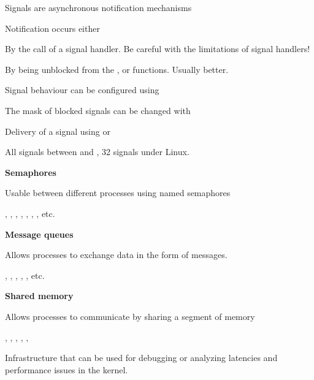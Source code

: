   \startitemize
  \item Signals are asynchronous notification mechanisms
  \item Notification occurs either
    \startitemize
    \item By the call of a signal handler. Be careful with the limitations of signal
      handlers!
    \item By being unblocked from the ,
       or  functions. Usually
      better.
    \stopitemize
  \item Signal behaviour can be configured using 
  \item The mask of blocked signals can be changed with
  \item Delivery of a signal using  or
  \item All signals between  and , 32
    signals under Linux.
  \stopitemize

  \startitemize
  \item {\bf Semaphores}
    \startitemize
    \item Usable between different processes using named semaphores
    \item {}, , ,
      , , ,
      , etc.
    \stopitemize
  \item {\bf Message queues}
    \startitemize
    \item Allows processes to exchange data in the form of messages.
    \item {}, , ,
      , , etc.
    \stopitemize
  \item {\bf Shared memory}
    \startitemize
    \item Allows processes to communicate by sharing a segment of
      memory
    \item {}, , ,
      , , 
    \stopitemize
  \stopitemize



  Infrastructure that can be used for debugging or analyzing latencies
  and performance issues in the kernel.

